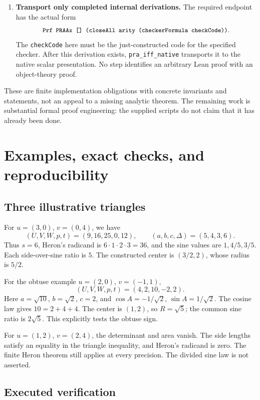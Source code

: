 \documentclass[11pt,a4paper]{article}
\theoremstyle{definition}
\newcommand{\code}[1]{\texttt{\small #1}}
\numberwithin{equation}{section}
\begin{document}
\begin{enumerate}
\item \textbf{Transport only completed internal derivations.}
The required endpoint has the actual form
\[
 \code{Prf PRAAx [] (closeAll arity (checkerFormula checkCode))}.
 \]
The \code{checkCode} here must be the just-constructed code for
the specified checker. After this derivation exists,
\code{pra\_iff\_native} transports it to the native scalar
presentation. No step identifies an arbitrary Lean proof with
an object-theory proof.
\end{enumerate}

These are finite implementation obligations with concrete invariants
and statements, not an appeal to a missing analytic theorem.
The remaining work is substantial formal proof engineering:
the supplied scripts do not claim that it has already been done.

\section{Examples, exact checks, and reproducibility}
\label{sec:validation}

\subsection{Three illustrative triangles}

For \(u=(3,0)\), \(v=(0,4)\), we have
\[
 (U,V,W,p,t)=(9,16,25,0,12),\qquad
 (a,b,c,\Delta)=(5,4,3,6).
\]
Thus \(s=6\), Heron's radicand is \(6\cdot1\cdot2\cdot3=36\),
and the sine values are \(1,4/5,3/5\). Each side-over-sine
ratio is \(5\). The constructed center is \((3/2,2)\),
whose radius is \(5/2\).

For the obtuse example \(u=(2,0)\), \(v=(-1,1)\),
\[
 (U,V,W,p,t)=(4,2,10,-2,2).
\]
Here \(a=\sqrt{10}\), \(b=\sqrt2\), \(c=2\), and
\(\cos A=-1/\sqrt2\), \(\sin A=1/\sqrt2\).
The cosine law gives \(10=2+4+4\).
The center is \((1,2)\), so \(R=\sqrt5\); the common sine
ratio is \(2\sqrt5\). This explicitly tests the obtuse sign.

For \(u=(1,2)\), \(v=(2,4)\), the determinant and area vanish.
The side lengths satisfy an equality in the triangle inequality,
and Heron's radicand is zero. The finite Heron theorem still
applies at every precision. The divided sine law is not asserted.

\subsection{Executed verification}
\end{document}

